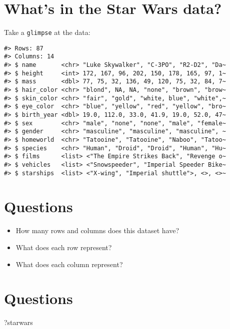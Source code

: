\documentclass[
]{book}
\newenvironment{Shaded}{\begin{snugshade}}{\end{snugshade}}
\newcommand{\NormalTok}[1]{#1}
\providecommand{\tightlist}{%
  \setlength{\itemsep}{0pt}\setlength{\parskip}{0pt}}
\theoremstyle{definition}
\theoremstyle{definition}
\theoremstyle{definition}
\theoremstyle{definition}
\theoremstyle{remark}
\begin{document}
\hypertarget{whats-in-the-star-wars-data}{%
\section{What's in the Star Wars data?}\label{whats-in-the-star-wars-data}}

Take a \texttt{glimpse} at the data:

\begin{verbatim}
#> Rows: 87
#> Columns: 14
#> $ name       <chr> "Luke Skywalker", "C-3PO", "R2-D2", "Da~
#> $ height     <int> 172, 167, 96, 202, 150, 178, 165, 97, 1~
#> $ mass       <dbl> 77, 75, 32, 136, 49, 120, 75, 32, 84, 7~
#> $ hair_color <chr> "blond", NA, NA, "none", "brown", "brow~
#> $ skin_color <chr> "fair", "gold", "white, blue", "white",~
#> $ eye_color  <chr> "blue", "yellow", "red", "yellow", "bro~
#> $ birth_year <dbl> 19.0, 112.0, 33.0, 41.9, 19.0, 52.0, 47~
#> $ sex        <chr> "male", "none", "none", "male", "female~
#> $ gender     <chr> "masculine", "masculine", "masculine", ~
#> $ homeworld  <chr> "Tatooine", "Tatooine", "Naboo", "Tatoo~
#> $ species    <chr> "Human", "Droid", "Droid", "Human", "Hu~
#> $ films      <list> <"The Empire Strikes Back", "Revenge o~
#> $ vehicles   <list> <"Snowspeeder", "Imperial Speeder Bike~
#> $ starships  <list> <"X-wing", "Imperial shuttle">, <>, <>~
\end{verbatim}

\hypertarget{questions}{%
\section{Questions}\label{questions}}

\begin{itemize}
\tightlist
\item
  How many rows and columns does this dataset have?
\item
  What does each row represent?
\item
  What does each column represent?
\end{itemize}

\hypertarget{questions-1}{%
\section{Questions}\label{questions-1}}

\begin{Shaded}
\begin{Highlighting}[]
\NormalTok{?starwars}
\end{Highlighting}
\end{Shaded}
\end{document}
